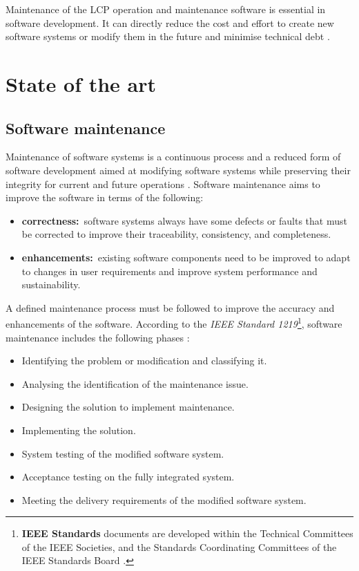 Maintenance of the LCP operation and maintenance software is essential in software development. It can directly reduce the cost and effort to create new software systems or modify them in the future and minimise technical debt \cite{Thamburaj2017, DeLeon-Sigg2020}.

\section{State of the art}\label{sec:ch1_stateOfArtSection}

\subsection{Software maintenance}\label{sec:ch1_softwareMaintenanceIntro}{}
Maintenance of software systems is a continuous process and a reduced form of software development aimed at modifying software systems while preserving their integrity for current and future operations \cite{Sneed2004, Ackermann2009, Port2017}. Software maintenance aims to improve the software in terms of the following:

\begin{itemize}
	\item \textbf{correctness:}~software systems always have some defects or faults that must be corrected to improve their traceability, consistency, and completeness.
	\item \textbf{enhancements:}\RaggedRight~existing software components need to be improved to adapt to changes in user requirements and improve system performance and sustainability.
\end{itemize}

A defined maintenance process must be followed to improve the accuracy and enhancements of the software. According to the \textit{IEEE Standard 1219}\footnote{\textbf{IEEE Standards} documents are developed within the Technical Committees of the IEEE Societies, and the Standards Coordinating Committees of the IEEE Standards Board \cite{Mamone1994}.}, software maintenance includes the following phases \cite{Mamone1994, Hasan2012, Stojanov2017}:

\begin{itemize}
	\item Identifying the problem or modification and classifying it.
	\item Analysing the identification of the maintenance issue.
	\item Designing the solution to implement maintenance.
	\item Implementing the solution.
	\item System testing of the modified software system.
	\item Acceptance testing on the fully integrated system.
	\item Meeting the delivery requirements of the modified software system.
\end{itemize}

